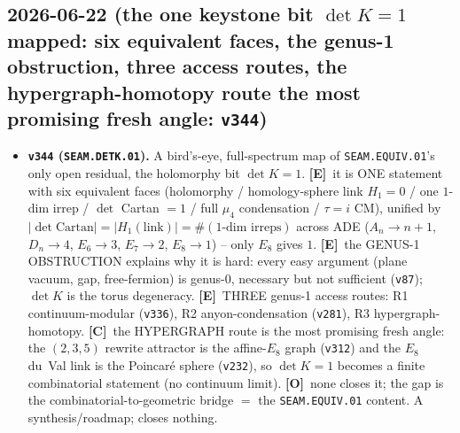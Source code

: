 \documentclass[11pt]{article}
\providecommand{\mE}{\textbf{[E]}}\providecommand{\mC}{\textbf{[C]}}
\providecommand{\mO}{\textbf{[O]}}\providecommand{\mX}{\textbf{[X]}}
\providecommand{\vref}[1]{\texttt{#1}}
\begin{document}
\subsection*{2026-06-22 (the one keystone bit $\det K{=}1$ mapped: six equivalent faces, the genus-1 obstruction, three access routes, the hypergraph-homotopy route the most promising fresh angle: \texttt{v344})}
\begin{itemize}
\item \textbf{\texttt{v344} (\texttt{SEAM.DETK.01}).} A bird's-eye, full-spectrum map of \texttt{SEAM.EQUIV.01}'s
only open residual, the holomorphy bit $\det K{=}1$. \mE\ it is ONE statement with six equivalent faces
(holomorphy / homology-sphere link $H_1{=}0$ / one $1$-dim irrep / $\det$ Cartan $=1$ / full $\mu_4$ condensation /
$\tau{=}i$ CM), unified by $|\det\mathrm{Cartan}|=|H_1(\text{link})|=\#(\text{1-dim irreps})$ across ADE
($A_n{\to}n{+}1$, $D_n{\to}4$, $E_6{\to}3$, $E_7{\to}2$, $E_8{\to}1$) -- only $E_8$ gives $1$. \mE\ the GENUS-1
OBSTRUCTION explains why it is hard: every easy argument (plane vacuum, gap, free-fermion) is genus-0, necessary
but not sufficient (\vref{v87}); $\det K$ is the torus degeneracy. \mE\ THREE genus-1 access routes: R1
continuum-modular (\vref{v336}), R2 anyon-condensation (\vref{v281}), R3 hypergraph-homotopy. \mC\ the HYPERGRAPH
route is the most promising fresh angle: the $(2,3,5)$ rewrite attractor is the affine-$E_8$ graph (\vref{v312}) and
the $E_8$ du~Val link is the Poincar\'e sphere (\vref{v232}), so $\det K{=}1$ becomes a finite combinatorial
statement (no continuum limit). \mO\ none closes it; the gap is the combinatorial-to-geometric bridge $=$ the
\texttt{SEAM.EQUIV.01} content. A synthesis/roadmap; closes nothing.
\end{itemize}
\end{document}
